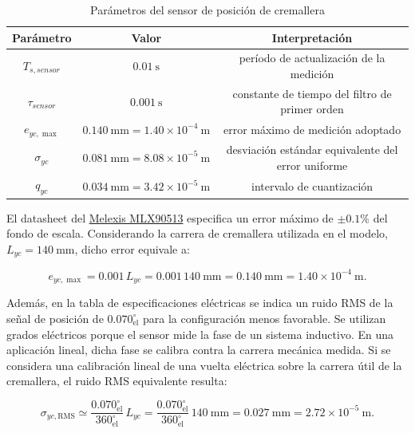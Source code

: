 \documentclass{article}
\begin{document}
\begin{table}[H]
\small
\centering
\caption{Parámetros del sensor de posición de cremallera}
\label{tab:parametros_sensor}
\begin{tabular}{c c c}
\toprule
\textbf{Parámetro} & \textbf{Valor} & \textbf{Interpretación} \\
\midrule
$T_{s,sensor}$ & $0.01\ \mathrm{s}$ & período de actualización de la medición \\
$\tau_{sensor}$ & $0.001\ \mathrm{s}$ & constante de tiempo del filtro de primer orden \\
$e_{yc,\max}$ & $0.140\ \mathrm{mm}=1.40\times10^{-4}\ \mathrm{m}$ & error máximo de medición adoptado \\
$\sigma_{yc}$ & $0.081\ \mathrm{mm}=8.08\times10^{-5}\ \mathrm{m}$ & desviación estándar equivalente del error uniforme \\
$q_{yc}$ & $0.034\ \mathrm{mm}=3.42\times10^{-5}\ \mathrm{m}$ & intervalo de cuantización \\
\bottomrule
\end{tabular}
\end{table}

El datasheet del \hyperlink{ref:mlx90513}{Melexis MLX90513} especifica un error máximo de $\pm 0.1\%$ del fondo de escala. Considerando la carrera de cremallera utilizada en el modelo, $L_{yc}=140\ \mathrm{mm}$, dicho error equivale a:

\begin{equation}
e_{yc,\max}=0.001\,L_{yc}=0.001\, 140\ \mathrm{mm}
=0.140\ \mathrm{mm}=1.40\times10^{-4}\ \mathrm{m}.
\end{equation}

Además, en la tabla de especificaciones eléctricas se indica un ruido RMS de la señal de posición de $0.070^\circ_{\mathrm{el}}$ para la configuración menos favorable. Se utilizan grados eléctricos porque el sensor mide la fase de un sistema inductivo. En una aplicación lineal, dicha fase se calibra contra la carrera mecánica medida. Si se considera una calibración lineal de una vuelta eléctrica sobre la carrera útil de la cremallera, el ruido RMS equivalente resulta:

\begin{equation}
\sigma_{yc,\mathrm{RMS}}\simeq
\frac{0.070^\circ_{\mathrm{el}}}{360^\circ_{\mathrm{el}}}\,L_{yc}
=
\frac{0.070^\circ_{\mathrm{el}}}{360^\circ_{\mathrm{el}}}\, 140\ \mathrm{mm}
=0.027\ \mathrm{mm}=2.72\times10^{-5}\ \mathrm{m}.
\end{equation}
\end{document}
